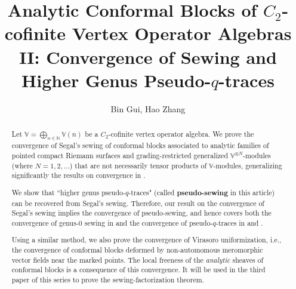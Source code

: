 \documentclass[11pt,b5paper,notitlepage]{article}
\title{Analytic Conformal Blocks of $C_2$-cofinite Vertex Operator Algebras II: Convergence of Sewing and Higher Genus Pseudo-$q$-traces}
\author{{\sc Bin Gui, Hao Zhang}
}
\date{}
\theoremstyle{definition}
\theoremstyle{plain}
\newcommand{\Vbb}{\mathbb V}
\newcommand{\Nbb}{\mathbb N}
\newcommand{\<}{\left\langle}
\renewcommand{\>}{\right\rangle}
\numberwithin{equation}{section}
\begin{document}
\sloppy %
	\setcounter{section}{-1}
	
	
	
	\maketitle
	
	
\newcommand\blfootnote[1]{%
	\begingroup
	\renewcommand\thefootnote{}\footnote{#1}%
	\addtocounter{footnote}{-1}%
	\endgroup
}



\begin{abstract}
Let $\Vbb=\bigoplus_{n\in\Nbb}\Vbb(n)$ be a $C_2$-cofinite vertex operator algebra. We prove the convergence of Segal's sewing of conformal blocks associated to analytic families of pointed compact Riemann surfaces and grading-restricted generalized $\Vbb^{\otimes N}$-modules (where $N=1,2,\dots$) that are not necessarily tensor products of $\Vbb$-modules, generalizing significantly the results on convergence in \cite{Gui-sewingconvergence}.

We show that ``higher genus pseudo-$q$-traces" (called \textbf{pseudo-sewing} in this article) can be recovered from Segal's sewing. Therefore, our result on the convergence of Segal's sewing implies the convergence of pseudo-sewing, and hence covers both the convergence of genus-$0$ sewing in \cite{HLZ7} and the convergence of pseudo-$q$-traces in \cite{Miy-modular-invariance} and \cite{Fio-genus-1}. 



Using a similar method, we also prove the convergence of Virasoro uniformization, i.e., the convergence of conformal blocks deformed by non-automomous meromorphic vector fields near the marked points. The local freeness of the \textit{analytic} sheaves of conformal blocks is a consequence of this convergence. It will be used in the third paper of this series to prove the sewing-factorization theorem.
\end{abstract}

 


\tableofcontents

\end{document}
